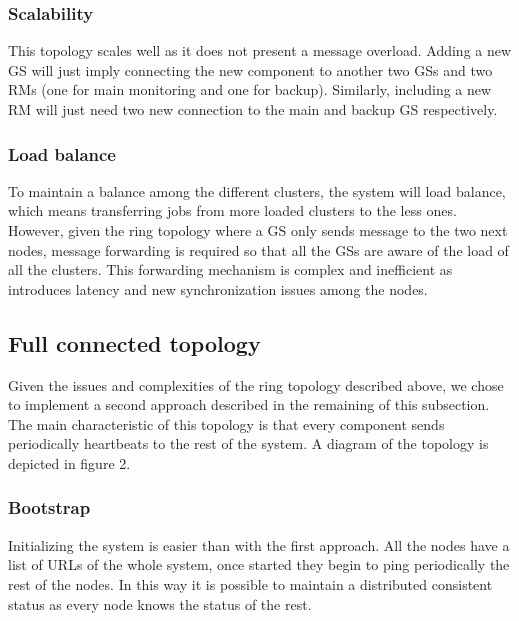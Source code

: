 \subsubsection{Scalability}
This topology scales well as it does not present a message overload. Adding a new GS will just imply connecting the new component to another two GSs and two RMs (one for main monitoring and one for backup). Similarly, including a new RM will just need two new connection to the main and backup GS respectively.

\subsubsection{Load balance}
To maintain a balance among the different clusters, the system will load balance, which means transferring jobs from more loaded clusters to the less ones. However, given the ring topology where a GS only sends message to the two next nodes, message forwarding is required so that all the GSs are aware of the load of all the clusters. This forwarding mechanism is complex and inefficient as introduces latency and new synchronization issues among the nodes.

\subsection{Full connected topology}
Given the issues and complexities of the ring topology described above, we chose to implement a second approach described in the remaining of this subsection. The main characteristic of this topology is that every component sends periodically heartbeats to the rest of the system. A diagram of the topology is depicted in figure 2.

\subsubsection{Bootstrap}
Initializing the system is easier than with the first approach. All the nodes have a list of URLs of the whole system, once started they begin to ping periodically the rest of the nodes. In this way it is possible to maintain a distributed consistent status as every node knows the status of the rest.


